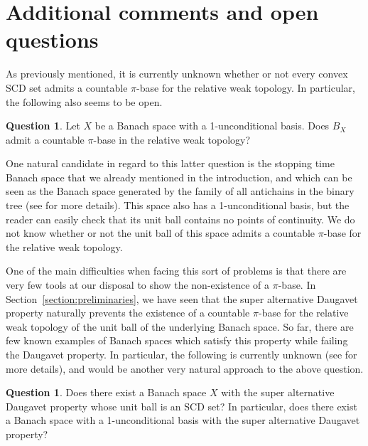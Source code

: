 \documentclass[11pt,a4paper,reqno]{amsart}
\numberwithin{equation}{section}
\newcommand{\1}{\mathbbm{1}}
\theoremstyle{plain}
\theoremstyle{definition}
\newtheorem{question}[theorem]{Question}
\begin{document}
\section{Additional comments and open questions}\label{section:open_questions}
As previously mentioned, it is currently unknown whether or not every convex SCD set admits a countable $\pi$-base for the relative weak topology. In particular, the following also seems to be open.

\begin{question}
    Let $X$ be a Banach space with a 1-unconditional basis. Does $B_X$ admit a countable $\pi$-base in the relative weak topology?
\end{question}

One natural candidate in regard to this latter question is the stopping time Banach space that we already mentioned in the introduction, and which can be seen as the Banach space generated by the family of all antichains in the binary tree (see \cite{BO89} for more details). This space also has a 1-unconditional basis, but the reader can easily check that its unit ball contains no points of continuity. We do not know whether or not the unit ball of this space admits a countable $\pi$-base for the relative weak topology.

One of the main difficulties when facing this sort of problems is that there are very few tools at our disposal to show the non-existence of a $\pi$-base. In Section~\ref{section:preliminaries}, we have seen that the super alternative Daugavet property naturally prevents the existence of a countable $\pi$-base for the relative weak topology of the unit ball of the underlying Banach space. So far, there are few known examples of Banach spaces which satisfy this property while failing the Daugavet property. In particular, the following is currently unknown (see \cite[Section~6]{LLMRZP25} for more details), and would be another very natural approach to the above question.

\begin{question}
    Does there exist a Banach space $X$ with the super alternative Daugavet property whose unit ball is an SCD set? In particular, does there exist a Banach space with a 1-unconditional basis with the super alternative Daugavet property?
\end{question}
\end{document}
